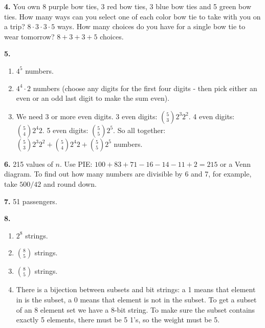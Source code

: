 \documentclass[10pt,]{book}
\theoremstyle{plain}
\theoremstyle{definition}
\theoremstyle{definition}
\theoremstyle{definition}
\numberwithin{equation}{section}
\begin{document}
%
\par\smallskip
\noindent\textbf{4.}\quad{}
            You own 8 purple bow ties, 3 red bow ties, 3 blue bow ties and 5 green bow ties. How many ways can you select one of each color bow tie to take with you on a trip? \(8 \cdot 3 \cdot 3 \cdot 5\) ways. How many choices do you have for a single bow tie to wear tomorrow? \(8 + 3 + 3 + 5\) choices.
\par\smallskip
\noindent\textbf{5.}\quad{}
          \leavevmode%
\begin{enumerate}[label=(\alph*)]
\item\hypertarget{li-730}{}\(4^5\) numbers.%
\item\hypertarget{li-731}{}\(4^4\cdot 2\) numbers (choose any digits for the first four digits - then pick either an even or an odd last digit to make the sum even).%
\item\hypertarget{li-732}{}
                We need 3 or more even digits. 3 even digits: \({5 \choose 3}2^3 2^2\). 4 even digits: \({5 \choose 4}2^4 2\). 5 even digits: \({5 \choose 5}2^5\). So all together: \({5 \choose 3}2^3 2^2 + {5 \choose 4}2^4 2 + {5 \choose 5}2^5\) numbers.
\end{enumerate}

%
\par\smallskip
\noindent\textbf{6.}\quad{}
            215 values of \(n\). Use PIE: \(100 + 83 + 71 - 16 - 14 -11 + 2 = 215\) or a Venn diagram. To find out how many numbers are divisible by 6 and 7, for example, take \(500/42\) and round down.
\par\smallskip
\noindent\textbf{7.}\quad{}
            51 passengers.
\par\smallskip
\noindent\textbf{8.}\quad{}
          \leavevmode%
\begin{enumerate}[label=(\alph*)]
\item\hypertarget{li-737}{}\(2^8\) strings.%
\item\hypertarget{li-738}{}\({8 \choose 5}\) strings.%
\item\hypertarget{li-739}{}\({8 \choose 5}\) strings.%
\item\hypertarget{li-740}{}
                There is a bijection between subsets and bit strings: a 1 means that element in is the subset, a 0 means that element is not in the subset. To get a subset of an 8 element set we have a 8-bit string. To make sure the subset contains exactly 5 elements, there must be 5 1's, so the weight must be 5.
\end{enumerate}
\end{document}
